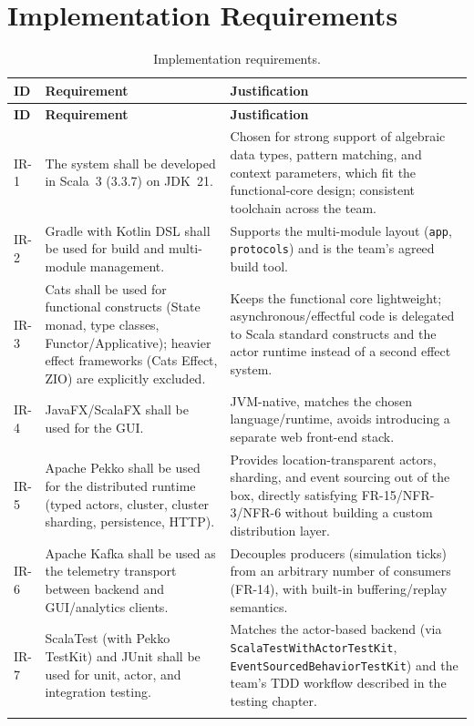 \documentclass{scrreprt}
\begin{document}
  \section{Implementation Requirements}
  \label{sec:implementation-requirements}

  \begin{longtable}{@{}p{1.2cm} p{6.0cm} p{6.9cm}@{}}
  \toprule
  \textbf{ID} & \textbf{Requirement} & \textbf{Justification} \\
  \midrule
  \endfirsthead
  \toprule
  \textbf{ID} & \textbf{Requirement} & \textbf{Justification} \\
  \midrule
  \endhead
  \bottomrule
  \endfoot

  IR-1 &
  The system shall be developed in Scala~3 (3.3.7) on JDK~21. &
  Chosen for strong support of algebraic data types, pattern matching, and
  context parameters, which fit the functional-core design; consistent
  toolchain across the team. \\

  IR-2 &
  Gradle with Kotlin DSL shall be used for build and multi-module
  management. &
  Supports the multi-module layout (\texttt{app}, \texttt{protocols}) and is
  the team's agreed build tool. \\

  IR-3 &
  Cats shall be used for functional constructs (State monad, type classes,
  Functor/Applicative); heavier effect frameworks (Cats Effect, ZIO) are
  explicitly excluded. &
  Keeps the functional core lightweight; asynchronous/effectful code is
  delegated to Scala standard constructs and the actor runtime instead of a
  second effect system. \\

  IR-4 &
  JavaFX/ScalaFX shall be used for the GUI. &
  JVM-native, matches the chosen language/runtime, avoids introducing a
  separate web front-end stack. \\

  IR-5 &
  Apache Pekko shall be used for the distributed runtime (typed actors,
  cluster, cluster sharding, persistence, HTTP). &
  Provides location-transparent actors, sharding, and event sourcing out of
  the box, directly satisfying FR-15/NFR-3/NFR-6 without building a custom
  distribution layer. \\

  IR-6 &
  Apache Kafka shall be used as the telemetry transport between backend and
  GUI/analytics clients. &
  Decouples producers (simulation ticks) from an arbitrary number of
  consumers (FR-14), with built-in buffering/replay semantics. \\

  IR-7 &
  ScalaTest (with Pekko TestKit) and JUnit shall be used for unit, actor,
  and
  integration testing. &
  Matches the actor-based backend (via \texttt{ScalaTestWithActorTestKit},
  \texttt{EventSourcedBehaviorTestKit}) and the team's TDD workflow
  described
  in the testing chapter. \\

  \caption{Implementation requirements.}
  \label{tab:implementation-requirements}
  \end{longtable}
\end{document}
